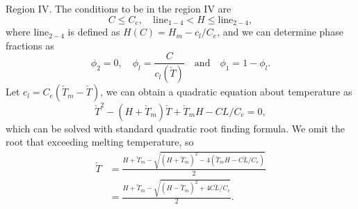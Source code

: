 \documentclass[usenames,dvipsnames,letterpaper,landscape,final]{slides}
\theoremstyle{definition}
\begin{document}
\begin{myslide}
Region IV.  
The conditions to be in the region IV are
\begin{equation*}
		  C \leq C_e, \quad
		  \text{line}_{1-4} < H \leq \text{line}_{2-4},
\end{equation*}
where $\text{line}_{2-4}$ is defined as $H(C) = H_m - c_l/C_e$,
and we can determine phase fractions as 
\begin{equation*}
    \phi_2 = 0, \quad \phi_l = \frac{C}{c_l(\check{T})} \quad \text{and} \quad \phi_1 = 1- \phi_l.
\end{equation*}
Let $c_l = C_e (\check{T}_m - \check{T})$,   
we can obtain a quadratic equation about temperature as
\begin{equation*}
		  \check{T}^2 - (H + \check{T}_m)\check{T} + 
		  \check{T}_m H - C L/C_e = 0,
\end{equation*}
which can be solved with standard quadratic root finding formula.
We omit the root that exceeding melting temperature, so
\begin{equation*}
		  \begin{aligned}
		  \check{T} &= \frac{H + \check{T}_m - 
		  \sqrt{ (H + \check{T}_m)^2 - 
		  4(\check{T}_m H - C \check{L}/C_e)} }{2} \\
					  &= 
		  \frac{H + \check{T}_m - 
		  \sqrt{ (H - \check{T}_m)^2 + 
		  4C \check{L}/C_e} }{2}. 
		  \end{aligned}
\end{equation*}

\end{myslide}
\end{document}

